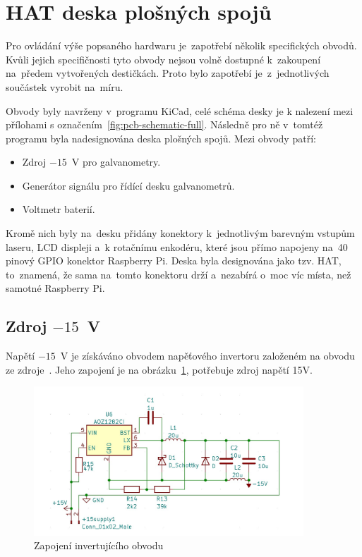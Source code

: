 \section{HAT deska plošných spojů}
Pro ovládání výše popsaného hardwaru je~zapotřebí několik specifických obvodů.
Kvůli jejich specifičnosti tyto obvody nejsou volně dostupné k~zakoupení na~předem vytvořených destičkách. Proto bylo zapotřebí je~z~jednotlivých součástek vyrobit na~míru.

Obvody byly navrženy v~programu KiCad, celé schéma desky je k nalezení mezi přílohami s označením~\ref{fig:pcb-schematic-full}. Následně pro ně v~tomtéž programu byla nadesignována deska plošných spojů. Mezi obvody patří:
\begin{itemize}
  \item Zdroj $-15$~V pro galvanometry.
  \item Generátor signálu pro řídící desku galvanometrů.
  \item Voltmetr baterií.
\end{itemize}

Kromě nich byly na~desku přidány konektory k~jednotlivým barevným vstupům laseru, LCD displeji a~k rotačnímu enkodéru, které jsou přímo napojeny na~40 pinový GPIO konektor Raspberry Pi.
Deska byla designována jako tzv. HAT, to~znamená, že sama na~tomto konektoru drží a~nezabírá o~moc víc místa, než samotné Raspberry Pi.

\subsection{Zdroj $-15$~V}\label{sec:negative-ps}
Napětí $-15$~V je získáváno obvodem napěťového invertoru založeném na obvodu ze zdroje~\cite{ampalyzer}. Jeho zapojení je na obrázku~\ref{fig:negative-ps}, potřebuje zdroj napětí 15V.

\begin{figure}[htb]
  \centering
  \includegraphics[width=0.9\textwidth]{img/negative-ps.jpg}
  \caption{\label{fig:negative-ps} Zapojení invertujícího obvodu}
\end{figure}

